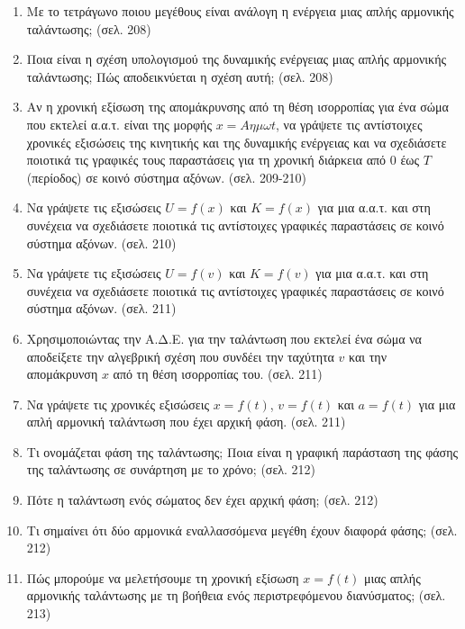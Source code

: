 \documentclass{article}
\begin{document}
\begin{enumerate}
      \item Με το τετράγωνο ποιου μεγέθους είναι ανάλογη η ενέργεια μιας απλής αρμονικής ταλάντωσης; (σελ. 208)

      \item Ποια είναι η σχέση υπολογισμού της δυναμικής ενέργειας μιας απλής αρμονικής ταλάντωσης; Πώς αποδεικνύεται η σχέση αυτή; (σελ. 208)

      \item Αν η χρονική εξίσωση της απομάκρυνσης από τη θέση ισορροπίας για ένα σώμα που εκτελεί α.α.τ. είναι της μορφής $x = A \eta\mu \omega t$, να γράψετε τις αντίστοιχες χρονικές εξισώσεις της κινητικής και της δυναμικής ενέργειας και να σχεδιάσετε ποιοτικά τις γραφικές τους παραστάσεις για τη χρονική διάρκεια από $0$ έως $T$ (περίοδος) σε κοινό σύστημα αξόνων. (σελ. 209-210)

      \item Να γράψετε τις εξισώσεις $U = f(x)$ και $K = f(x)$ για μια α.α.τ. και στη συνέχεια να σχεδιάσετε ποιοτικά τις αντίστοιχες γραφικές παραστάσεις σε κοινό σύστημα αξόνων. (σελ. 210)

      \item Να γράψετε τις εξισώσεις $U = f(v)$ και $K = f(v)$ για μια α.α.τ. και στη συνέχεια να σχεδιάσετε ποιοτικά τις αντίστοιχες γραφικές παραστάσεις σε κοινό σύστημα αξόνων. (σελ. 211)

      \item Χρησιμοποιώντας την Α.Δ.Ε. για την ταλάντωση που εκτελεί ένα σώμα να αποδείξετε την αλγεβρική σχέση που συνδέει την ταχύτητα $v$ και την απομάκρυνση $x$ από τη θέση ισορροπίας του. (σελ. 211)

      \item Να γράψετε τις χρονικές εξισώσεις $x = f(t)$, $v = f(t)$ και $a = f(t)$ για μια απλή αρμονική ταλάντωση που έχει αρχική φάση. (σελ. 211)

      \item Τι ονομάζεται φάση της ταλάντωσης; Ποια είναι η γραφική παράσταση της φάσης της ταλάντωσης σε συνάρτηση με το χρόνο; (σελ. 212)

      \item Πότε η ταλάντωση ενός σώματος δεν έχει αρχική φάση; (σελ. 212)

      \item Τι σημαίνει ότι δύο αρμονικά εναλλασσόμενα μεγέθη έχουν διαφορά φάσης; (σελ. 212)

      \item Πώς μπορούμε να μελετήσουμε τη χρονική εξίσωση $x = f(t)$ μιας απλής αρμονικής ταλάντωσης με τη βοήθεια ενός περιστρεφόμενου διανύσματος; (σελ. 213)


\end{enumerate}
\end{document}
